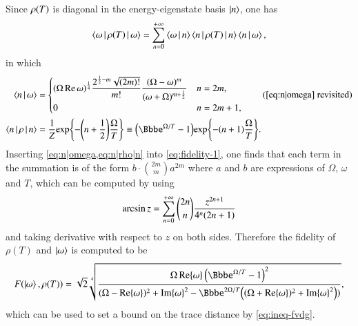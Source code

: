 Since ${\rho}\mathopen{}\left(T\right)\mathclose{}$ is diagonal in the energy-eigenstate basis $\Ket{n}$, one 
has
\begin{equation}
\Braket{\omega | {\rho}\mathopen{}\left(T\right)\mathclose{} | \omega} = \sum_{n=0}^{+\infty}
\Braket{\omega | n} \Braket{n | {\rho}\mathopen{}\left(T\right)\mathclose{} | n} \Braket{n | \omega},
\label{eq:fidelity-1}
\end{equation}
in which
\begin{align}
\Braket{n | \omega} &= 
\begin{cases} \rbr{\Omega  \Re\omega }^{\frac{1}{4}}
\dfrac{2^{\frac{1}{2}-m} \sqrt{(2 m)!} }{m!}
\dfrac{(\Omega -\omega )^m}{(\omega +\Omega )^{m+\frac{1}{2}}}
& n = 2m, \\
0 & n = 2m+1,
\end{cases}
\tag{\ref{eq:n|omega} revisited} \\
\Braket{n | \rho | n} &=
\frac{1}{Z}\cfun{\exp}{-\rbr{n+\frac{1}{2}}\frac{\Omega}{T}}
\equiv 
\rbr{\ee^{\Omega/T}-1} \cfun{\exp}{-\rbr{n+1}\frac{\Omega}{T}}.
\label{eq:n|rho|n}
\end{align}
Inserting \cref{eq:n|omega,eq:n|rho|n} into \cref{eq:fidelity-1}, one finds 
that each term in the summation is of the form $b\cdot\binom{2m}{m}a^{2m}$ 
where $a$ and $b$ are expressions of $\Omega$, $\omega$ and $T$, which can be 
computed by using
\begin{equation}
\arcsin z = \sum_{n=0}^{+\infty} \binom{2n}{n}\frac{z^{2n+1}}{4^n{\left(2n+1\right)}}
\end{equation}
and taking derivative with respect to $z$ on both sides. Therefore the fidelity 
of $\rho(T)$ and $\Ket{\omega}$ is computed to be
\begin{equation}
\rfun{F}{\Ket{\omega}, \rho(T)} = \sqrt{2} \sqrt[4]{\frac{\Omega  \Re{\omega} 
\left(\ee^{\Omega /T}-1\right)^2}{(\Omega -\Re{\omega})^2+\Im{\omega}^2 - 
\ee^{2 \Omega/T} \rbr{(\Omega +\Re{\omega})^2+\Im{\omega}^2})}},
\label{eq:fidelity-gg-th}
\end{equation}
which can be used to set a bound on the trace distance by \cref{eq:ineq-fvdg}.

